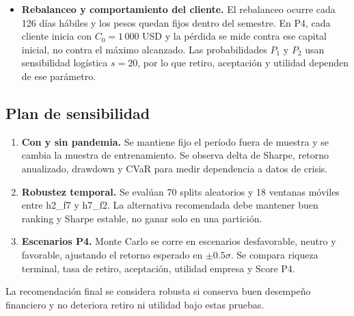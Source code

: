 \begin{itemize}
    \item \textbf{Rebalanceo y comportamiento del cliente.} El rebalanceo ocurre
    cada 126 d\'ias h\'abiles y los pesos quedan fijos dentro del semestre. En
    P4, cada cliente inicia con $C_0=1\,000$ USD y la p\'erdida se mide contra
    ese capital inicial, no contra el m\'aximo alcanzado. Las probabilidades
    $P_1$ y $P_2$ usan sensibilidad log\'istica $s=20$, por lo que retiro,
    aceptaci\'on y utilidad dependen de ese par\'ametro.
\end{itemize}

\subsection{Plan de sensibilidad}

\begin{enumerate}
    \item \textbf{Con y sin pandemia.} Se mantiene fijo el per\'iodo fuera de
    muestra y se cambia la muestra de entrenamiento. Se observa delta de
    Sharpe, retorno anualizado, drawdown y CVaR para medir dependencia a datos
    de crisis.

    \item \textbf{Robustez temporal.} Se eval\'uan 70 splits aleatorios y 18
    ventanas m\'oviles entre h2\_f7 y h7\_f2. La alternativa recomendada debe
    mantener buen ranking y Sharpe estable, no ganar solo en una partici\'on.

    \item \textbf{Escenarios P4.} Monte Carlo se corre en escenarios
    desfavorable, neutro y favorable, ajustando el retorno esperado en
    $\pm 0.5\sigma$. Se compara riqueza terminal, tasa de retiro, aceptaci\'on,
    utilidad empresa y Score P4.
\end{enumerate}

La recomendaci\'on final se considera robusta si conserva buen desempe\~no
financiero y no deteriora retiro ni utilidad bajo estas pruebas.
